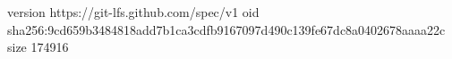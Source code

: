 version https://git-lfs.github.com/spec/v1
oid sha256:9cd659b3484818add7b1ca3cdfb9167097d490c139fe67dc8a0402678aaaa22c
size 174916
